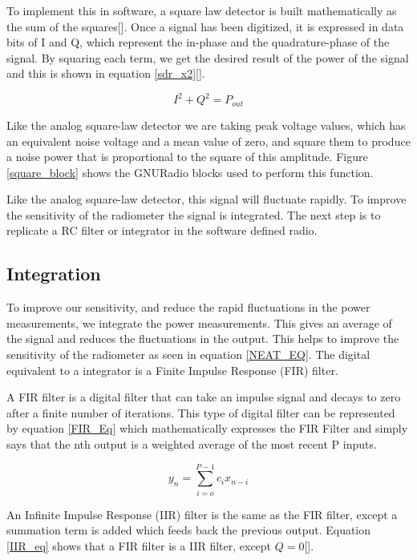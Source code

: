 To implement this in software, a square law detector is built mathematically as the sum of the squares[\cite{Sarijari}].  Once a signal has been digitized, it is expressed in data bits of I and Q, which represent the in-phase and the quadrature-phase of the signal.  By squaring each term, we get the desired result of the power of the signal and this is shown in equation \ref{sdr_x2}[\cite{Rashid}].

\begin{equation}\label{sdr_x2}
I^2+Q^2 = P_{out}
\end{equation}

Like the analog square-law detector we are taking peak voltage values, which has an equivalent noise voltage and a mean value of zero, and square them to produce a noise power that is proportional to the square of this amplitude.  Figure \ref{square_block} shows the GNURadio blocks used to perform this function.

Like the analog square-law detector, this signal will fluctuate rapidly.  To improve the sensitivity of the radiometer the signal is integrated.  The next step is to replicate a RC filter or integrator in the software defined radio.

\subsection{Integration}

To improve our sensitivity, and reduce the rapid fluctuations in the power measurements, we integrate the power measurements.  This gives an average of the signal and reduces the fluctuations in the output.  This helps to improve the sensitivity of the radiometer as seen in equation \ref{NEAT_EQ}.  The digital equivalent to a integrator is a Finite Impulse Response (FIR) filter.

A FIR filter is a digital filter that can take an impulse signal and decays to zero after a finite number of iterations.  This type of digital filter can be represented by equation \ref{FIR_Eq} which mathematically expresses the FIR Filter and simply says that the nth output is a weighted average of the most recent P inputs. 

\begin{equation}\label{FIR_Eq}
y_n=\displaystyle\sum\limits_{i=o}^{P-1} c_ix_{n-i}
\end{equation} 

An Infinite Impulse Response (IIR) filter is the same as the FIR filter, except a summation term is added which feeds back the previous output.  Equation \ref{IIR_eq} shows that a FIR filter is a IIR filter, except $Q=0$[\cite{Cross}]. 

